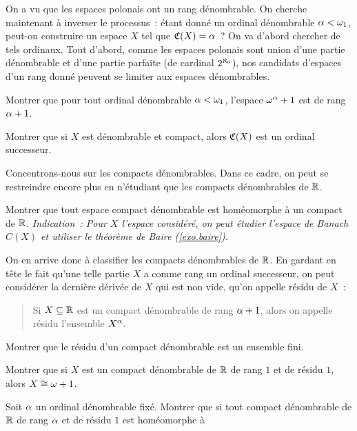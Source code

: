 \begin{problem}

  On a vu que les espaces polonais ont un rang dénombrable. On cherche
  maintenant à inverser le processus~: étant donné un ordinal dénombrable
  $\alpha < \omega_1$, peut-on construire un espace $X$ tel que
  $\mathfrak{C}(X) = \alpha$~? On va d'abord chercher de tels ordinaux. Tout
  d'abord, comme les espaces polonais sont union d'une partie dénombrable et
  d'une partie parfaite (de cardinal $2^{\aleph_0}$), nos candidats d'espaces
  d'un rang donné peuvent se limiter aux espaces dénombrables.
  \begin{pbQuest}
  \item Montrer que pour tout ordinal dénombrable $\alpha < \omega_1$, l'espace
    $\omega^{\alpha} + 1$ est de rang $\alpha + 1$.
  \item Montrer que si $X$ est dénombrable et compact, alors $\mathfrak{C}(X)$ est
    un ordinal successeur.
  \end{pbQuest}
  Concentrons-nous sur les compacts dénombrables. Dans ce cadre, on peut se
  restreindre encore plus en n'étudiant que les compacts dénombrables de $\mathbb R$.
  \begin{pbQuest}[resume]
  \item Montrer que tout espace compact dénombrable est homéomorphe à un compact
    de $\mathbb R$. \textit{Indication~: Pour $X$ l'espace considéré, on peut étudier
      l'espace de Banach $C(X)$ et utiliser le théorème de Baire
      (\cref{exo.baire}).}
  \end{pbQuest}
  On en arrive donc à classifier les compacts dénombrables de $\mathbb R$. En gardant
  en tête le fait qu'une telle partie $X$ a comme rang un ordinal successeur, on
  peut considérer la dernière dérivée de $X$ qui est non vide, qu'on appelle
  résidu de $X$~:
  \begin{quotation}
    \noindent
    Si $X \subseteq \mathbb R$ est un compact dénombrable de rang $\alpha + 1$, alors
    on appelle résidu l'ensemble $X^{\alpha}$.
  \end{quotation}
  \begin{pbQuest}[resume]
  \item Montrer que le résidu d'un compact dénombrable est un ensemble fini.
  \item Montrer que si $X$ est un compact dénombrable de $\mathbb R$ de rang $1$ et de
    résidu $1$, alors $X \cong \omega + 1$.
  \item Soit $\alpha$ un ordinal dénombrable fixé. Montrer que si tout compact
    dénombrable de $\mathbb R$ de rang $\alpha$ et de résidu $1$ est homéomorphe à

\end{pbQuest}
\end{problem}
